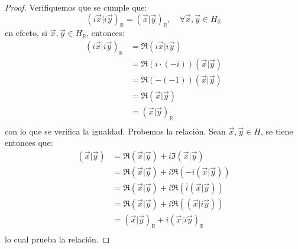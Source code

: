 \documentclass[12pt]{report}
\newcounter{it}
\theoremstyle{largebreak}
\newcommand\pint[2]{\ensuremath{\left(#1\big|#2\right)}}
\newcommand\conj[1]{\ensuremath{\overline{#1}}}
\begin{document}
\begin{proof}
        Verifiquemos que se cumple que:
        \begin{equation*}
            \pint{i\vec{x}}{i\vec{y}}_{\mathbb{R}}=\pint{\vec{x}}{\vec{y}}_{\mathbb{R}},\quad\forall\vec{x},\vec{y}\in H_{\mathbb{R}}
        \end{equation*}
        en efecto, si $\vec{x},\vec{y}\in H_{\mathbb{R}}$, entonces:
        \begin{equation*}
            \begin{split}
                \pint{i\vec{x}}{i\vec{y}}_{\mathbb{R}}&=\Re\pint{i\vec{x}}{i\vec{y}}\\
                &=\Re(i\cdot(-i))\pint{\vec{x}}{\vec{y}}\\
                &=\Re(-(-1))\pint{\vec{x}}{\vec{y}}\\
                &=\Re\pint{\vec{x}}{\vec{y}}\\
                &=\pint{\vec{x}}{\vec{y}}_{\mathbb{R}}\\
            \end{split}
        \end{equation*}
        con lo que se verifica la igualdad. Probemos la relación. Sean $\vec{x},\vec{y}\in H$, se tiene entonces que:
        \begin{equation*}
            \begin{split}
                \pint{\vec{x}}{\vec{y}}&=\Re\pint{\vec{x}}{\vec{y}}+i\Im\pint{\vec{x}}{\vec{y}}\\
                &=\Re\pint{\vec{x}}{\vec{y}}+i\Re(-i\pint{\vec{x}}{\vec{y}})\\
                &=\Re\pint{\vec{x}}{\vec{y}}+i\Re(\conj{i}\pint{\vec{x}}{\vec{y}})\\
                &=\Re\pint{\vec{x}}{\vec{y}}+i\Re(\pint{\vec{x}}{i\vec{y}})\\
                &=\pint{\vec{x}}{\vec{y}}_{\mathbb{R}}+i\pint{\vec{x}}{i\vec{y}}_{\mathbb{R}}\\
            \end{split}
        \end{equation*}
        lo cual prueba la relación.


\end{proof}
\end{document}
